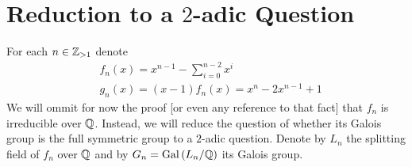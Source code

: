 \documentclass[../main.tex]{subfiles}
\begin{document}
\section{Reduction to a $2$-adic Question}
For each $n \in \mathbb{Z}_{> 1}$ denote 
\begin{align*}
  & f_n\left( x \right) = x^{n-1} - \sum_{i=0}^{n-2} x^i \\
  & g_n\left( x \right) = \left( x - 1 \right)f_n\left( x \right) = x^n - 2x^{n-1} + 1
\end{align*}
We will ommit for now the proof [or even any reference to that fact] that $f_n$ is irreducible over $\mathbb{Q}$.
Instead, we will reduce the question of whether its Galois group is the full symmetric group to a $2$-adic question.
Denote by $L_n$ the splitting field of $f_n$ over $\mathbb{Q}$ and by $G_n = \operatorname{Gal}\left( L_n / \mathbb{Q} \right)$ its Galois group.
\end{document}
